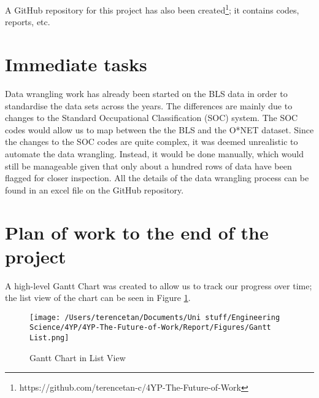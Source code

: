 \documentclass[11pt]{article}
\begin{document}
A GitHub repository for this project has also been created\footnote{https://github.com/terencetan-c/4YP-The-Future-of-Work}; it contains codes, reports, etc.


  

    
  \section{Immediate tasks}
  Data wrangling work has already been started on the BLS data in order to standardise the data sets across the years. The differences are mainly due to changes to the Standard Occupational Classification (SOC) system. The SOC codes would allow us to map between the the BLS and the O*NET dataset. Since the changes to the SOC codes are quite complex, it was deemed unrealistic to automate the data wrangling. Instead, it would be done manually, which would still be manageable given that only about a hundred rows of data have been flagged for closer inspection. All the details of the data wrangling process can be found in an excel file on the GitHub repository.

  \section{Plan of work to the end of the project}
  A high-level Gantt Chart was created to allow us to track our progress over time; the list view of the chart can be seen in Figure \ref{fig:gantt}.

  \begin{figure}[!htb]
    \centering
    \texttt{[image: /Users/terencetan/Documents/Uni stuff/Engineering Science/4YP/4YP-The-Future-of-Work/Report/Figures/Gantt List.png]}
    \caption{Gantt Chart in List View}
    \label{fig:gantt}

  \end{figure}

    \printbibliography[heading=bibintoc]
\end{document}
